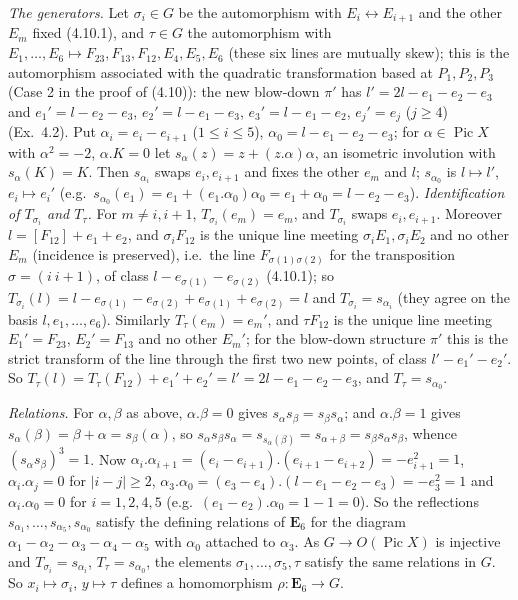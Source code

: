 \documentclass[11pt]{article}
\begin{document}
\emph{The generators.} Let $\sigma_i\in G$ be the automorphism with $E_i\leftrightarrow E_{i+1}$ and the other $E_m$ fixed (4.10.1), and $\tau\in G$ the automorphism with $E_1,\dots,E_6\mapsto F_{23},F_{13},F_{12},E_4,E_5,E_6$ (these six lines are mutually skew); this is the automorphism associated with the quadratic transformation based at $P_1,P_2,P_3$ (Case 2 in the proof of (4.10)): the new blow-down $\pi'$ has $l'=2l-e_1-e_2-e_3$ and $e_1'=l-e_2-e_3$, $e_2'=l-e_1-e_3$, $e_3'=l-e_1-e_2$, $e_j'=e_j$ ($j\ge4$) (Ex.~4.2). Put $\alpha_i=e_i-e_{i+1}$ ($1\le i\le5$), $\alpha_0=l-e_1-e_2-e_3$; for $\alpha\in\operatorname{Pic}X$ with $\alpha^2=-2$, $\alpha.K=0$ let $s_\alpha(z)=z+(z.\alpha)\alpha$, an isometric involution with $s_\alpha(K)=K$. Then $s_{\alpha_i}$ swaps $e_i,e_{i+1}$ and fixes the other $e_m$ and $l$; $s_{\alpha_0}$ is $l\mapsto l'$, $e_i\mapsto e_i'$ (e.g.\ $s_{\alpha_0}(e_1)=e_1+(e_1.\alpha_0)\alpha_0=e_1+\alpha_0=l-e_2-e_3$). \emph{Identification of $T_{\sigma_i}$ and $T_\tau$.} For $m\ne i,i+1$, $T_{\sigma_i}(e_m)=e_m$, and $T_{\sigma_i}$ swaps $e_i,e_{i+1}$. Moreover $l=[F_{12}]+e_1+e_2$, and $\sigma_iF_{12}$ is the unique line meeting $\sigma_iE_1,\sigma_iE_2$ and no other $E_m$ (incidence is preserved), i.e.\ the line $F_{\sigma(1)\sigma(2)}$ for the transposition $\sigma=(i\ i+1)$, of class $l-e_{\sigma(1)}-e_{\sigma(2)}$ (4.10.1); so $T_{\sigma_i}(l)=l-e_{\sigma(1)}-e_{\sigma(2)}+e_{\sigma(1)}+e_{\sigma(2)}=l$ and $T_{\sigma_i}=s_{\alpha_i}$ (they agree on the basis $l,e_1,\dots,e_6$). Similarly $T_\tau(e_m)=e_m'$, and $\tau F_{12}$ is the unique line meeting $E_1'=F_{23}$, $E_2'=F_{13}$ and no other $E_m'$; for the blow-down structure $\pi'$ this is the strict transform of the line through the first two new points, of class $l'-e_1'-e_2'$. So $T_\tau(l)=T_\tau(F_{12})+e_1'+e_2'=l'=2l-e_1-e_2-e_3$, and $T_\tau=s_{\alpha_0}$.

\emph{Relations.} For $\alpha,\beta$ as above, $\alpha.\beta=0$ gives $s_\alpha s_\beta=s_\beta s_\alpha$; and $\alpha.\beta=1$ gives $s_\alpha(\beta)=\beta+\alpha=s_\beta(\alpha)$, so $s_\alpha s_\beta s_\alpha=s_{s_\alpha(\beta)}=s_{\alpha+\beta}=s_\beta s_\alpha s_\beta$, whence $(s_\alpha s_\beta)^3=1$. Now $\alpha_i.\alpha_{i+1}=(e_i-e_{i+1}).(e_{i+1}-e_{i+2})=-e_{i+1}^2=1$, $\alpha_i.\alpha_j=0$ for $|i-j|\ge2$, $\alpha_3.\alpha_0=(e_3-e_4).(l-e_1-e_2-e_3)=-e_3^2=1$ and $\alpha_i.\alpha_0=0$ for $i=1,2,4,5$ (e.g.\ $(e_1-e_2).\alpha_0=1-1=0$). So the reflections $s_{\alpha_1},\dots,s_{\alpha_5},s_{\alpha_0}$ satisfy the defining relations of $\mathbf E_6$ for the diagram $\alpha_1-\alpha_2-\alpha_3-\alpha_4-\alpha_5$ with $\alpha_0$ attached to $\alpha_3$. As $G\to O(\operatorname{Pic}X)$ is injective and $T_{\sigma_i}=s_{\alpha_i}$, $T_\tau=s_{\alpha_0}$, the elements $\sigma_1,\dots,\sigma_5,\tau$ satisfy the same relations in $G$. So $x_i\mapsto\sigma_i$, $y\mapsto\tau$ defines a homomorphism $\rho:\mathbf E_6\to G$.
\end{document}
